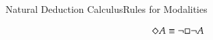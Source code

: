 \begin{frame}[shrink]{Natural Deduction Calculus}{Rules for Modalities}

\begin{unnamedCalculus}

\vspace{1em}

\s\s\s\s
{}
\s\s\s\s\s
{}

\vspace{2em}

\pause

\alert{$$\Diamond A \equiv \neg \Box \neg A$$}

\pause

\vspace{2em}

\s\s\s\s
{}
\s\s\s\s\s
{}


\vspace{1em}

\end{unnamedCalculus}

\end{frame}











